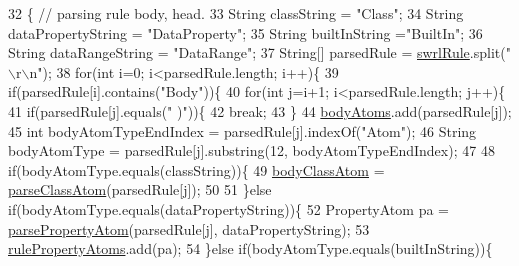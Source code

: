 \begin{DoxyCode}
32                               \{ \textcolor{comment}{// parsing rule body, head.}
33         String classString = \textcolor{stringliteral}{"Class"};
34         String dataPropertyString = \textcolor{stringliteral}{"DataProperty"};
35         String builtInString =\textcolor{stringliteral}{"BuiltIn"};
36         String dataRangeString = \textcolor{stringliteral}{"DataRange"};
37         String[] parsedRule = \mbox{\hyperlink{classcom_1_1github_1_1aites_1_1framework_1_1rule_1_1_s_w_r_lrule_adde1291a731073840a5ac9e535bf6f3f}{swrlRule}}.split(\textcolor{stringliteral}{"\(\backslash\)r\(\backslash\)n"});
38         \textcolor{keywordflow}{for}(\textcolor{keywordtype}{int} i=0; i<parsedRule.length; i++)\{
39             \textcolor{keywordflow}{if}(parsedRule[i].contains(\textcolor{stringliteral}{"Body"}))\{
40                 \textcolor{keywordflow}{for}(\textcolor{keywordtype}{int} j=i+1; i<parsedRule.length; j++)\{
41                     \textcolor{keywordflow}{if}(parsedRule[j].equals(\textcolor{stringliteral}{"        )"}))\{
42                         \textcolor{keywordflow}{break};
43                     \}
44                     \mbox{\hyperlink{classcom_1_1github_1_1aites_1_1framework_1_1rule_1_1_s_w_r_lrule_a83f3d18acd20dd43b8ade45e8c129123}{bodyAtoms}}.add(parsedRule[j]);
45                     \textcolor{keywordtype}{int} bodyAtomTypeEndIndex = parsedRule[j].indexOf(\textcolor{stringliteral}{"Atom"}); 
46                     String bodyAtomType = parsedRule[j].substring(12, bodyAtomTypeEndIndex);
47                 
48                     \textcolor{keywordflow}{if}(bodyAtomType.equals(classString))\{
49                         \mbox{\hyperlink{classcom_1_1github_1_1aites_1_1framework_1_1rule_1_1_s_w_r_lrule_a3400b10f602a6a7d7abd42681d7af024}{bodyClassAtom}} = \mbox{\hyperlink{classcom_1_1github_1_1aites_1_1framework_1_1rule_1_1_s_w_r_lrule_ab01ac639c58b1478dc20272002106798}{parseClassAtom}}(parsedRule[j]);
50                     
51                     \}\textcolor{keywordflow}{else} \textcolor{keywordflow}{if}(bodyAtomType.equals(dataPropertyString))\{
52                         PropertyAtom pa = \mbox{\hyperlink{classcom_1_1github_1_1aites_1_1framework_1_1rule_1_1_s_w_r_lrule_a5d90fa24f6f2a2db3a435905f68bbce2}{parsePropertyAtom}}(parsedRule[j],
      dataPropertyString);
53                         \mbox{\hyperlink{classcom_1_1github_1_1aites_1_1framework_1_1rule_1_1_s_w_r_lrule_a4236a432610492bb79e3822eec52fea3}{rulePropertyAtoms}}.add(pa);
54                     \}\textcolor{keywordflow}{else} \textcolor{keywordflow}{if}(bodyAtomType.equals(builtInString))\{

\end{DoxyCode}
